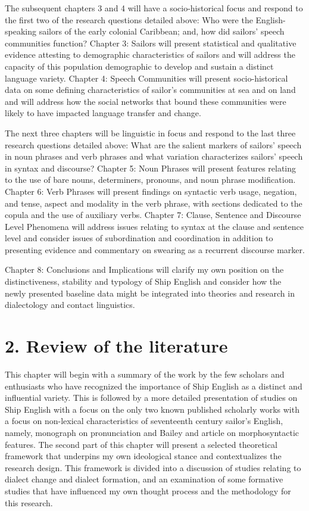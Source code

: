   The subsequent chapters 3 and 4 will have a socio-historical focus and respond to the first two of the research questions detailed above: Who were the English-speaking sailors of the early colonial Caribbean; and, how did sailors’ speech communities function? Chapter 3: Sailors will present statistical and qualitative evidence attesting to demographic characteristics of sailors and will address the capacity of this population demographic to develop and sustain a distinct language variety. Chapter 4: Speech Communities will present socio-historical data on some defining characteristics of sailor’s communities at sea and on land and will address how the social networks that bound these communities were likely to have impacted language transfer and change.  



  The next three chapters will be linguistic in focus and respond to the last three research questions detailed above: What are the salient markers of sailors’ speech in noun phrases and verb phrases and what variation characterizes sailors’ speech in syntax and discourse? Chapter 5: Noun Phrases will present features relating to the use of bare nouns, determiners, pronouns, and noun phrase modification. Chapter 6: Verb Phrases will present findings on syntactic verb usage, negation, and tense, aspect and modality in the verb phrase, with sections dedicated to the copula and the use of auxiliary verbs. Chapter 7: Clause, Sentence and Discourse Level Phenomena will address issues relating to syntax at the clause and sentence level and consider issues of subordination and coordination in addition to presenting evidence and commentary on swearing as a recurrent discourse marker.



  Chapter 8: Conclusions and Implications will clarify my own position on the distinctiveness, stability and typology of Ship English and consider how the newly presented baseline data might be integrated into theories and research in dialectology and contact linguistics.


\chapter{{2.} {Review} {of} {the} {literature}}

  This chapter will begin with a summary of the work by the few scholars and enthusiasts who have recognized the importance of Ship English as a distinct and influential variety. This is followed by a more detailed presentation of studies on Ship English with a focus on the only two known published scholarly works with a focus on non-lexical characteristics of seventeenth century sailor’s English, namely,  monograph on pronunciation and Bailey and  article on morphosyntactic features. The second part of this chapter will present a selected theoretical framework that underpins my own ideological stance and contextualizes the research design. This framework is divided into a discussion of studies relating to dialect change and dialect formation, and an examination of some formative studies that have influenced my own thought process and the methodology for this research. 

